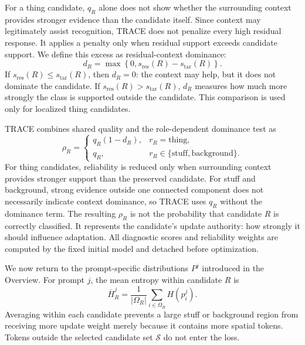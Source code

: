 \documentclass[letterpaper]{article}
\begin{document}
	For a thing candidate, $q_R$ alone does not show whether the surrounding context provides stronger evidence than the candidate itself. Since context may legitimately assist recognition, TRACE does not penalize every high residual response. It applies a penalty only when residual support exceeds candidate support. We define this excess as residual-context dominance:
	\begin{equation}
		d_R
		=
		\max
		\left\{
		0,
		s_{\mathrm{res}}(R)
		-
		s_{\mathrm{tar}}(R)
		\right\}.
	\end{equation}
	If $s_{\mathrm{res}}(R)\leq s_{\mathrm{tar}}(R)$, then $d_R=0$: the context may help, but it does not dominate the candidate. If $s_{\mathrm{res}}(R)>s_{\mathrm{tar}}(R)$, $d_R$ measures how much more strongly the class is supported outside the candidate. This comparison is used only for localized thing candidates.
	
	TRACE combines shared quality and the role-dependent dominance test as
	\begin{equation}
		\rho_R
		=
		\begin{cases}
			q_R(1-d_R),
			& r_R=\mathrm{thing},
			\\[2pt]
			q_R,
			& r_R\in\{\mathrm{stuff},\mathrm{background}\}.
		\end{cases}
	\end{equation}
	For thing candidates, reliability is reduced only when surrounding context provides stronger support than the preserved candidate. For stuff and background, strong evidence outside one connected component does not necessarily indicate context dominance, so TRACE uses $q_R$ without the dominance term. The resulting $\rho_R$ is not the probability that candidate $R$ is correctly classified. It represents the candidate's update authority: how strongly it should influence adaptation. All diagnostic scores and reliability weights are computed by the fixed initial model and detached before optimization.
	
	We now return to the prompt-specific distributions $P^j$ introduced in the Overview. For prompt $j$, the mean entropy within candidate $R$ is
	\begin{equation}
		\overline H_R^j
		=
		\frac{1}{|\Omega_R|}
		\sum_{i\in\Omega_R}
		H(p_i^j).
	\end{equation}
	Averaging within each candidate prevents a large stuff or background region from receiving more update weight merely because it contains more spatial tokens. Tokens outside the selected candidate set $\mathcal S$ do not enter the loss.
	
\end{document}
